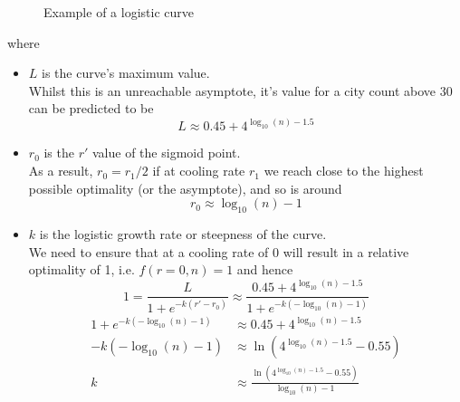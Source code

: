 \documentclass{article}
\begin{document}
\begin{figure}[H]
    \centering
    \caption{Example of a logistic curve}
\end{figure}

where
\begin{itemize}
    \item $L$ is the curve's maximum value. \\
    Whilst this is an unreachable asymptote, it's value for a city count above 30 can be predicted to be
    $$L \approx 0.45 + 4^{\log_{10}(n) - 1.5}$$
    
    \item $r_0$ is the $r'$ value of the sigmoid point. \\
    As a result, $r_0 = r_1 / 2$ if at cooling rate $r_1$ we reach close to the highest possible optimality (or the asymptote), and so is around
    $$r_0 \approx \log_{10}(n) - 1$$
    
    \item $k$ is the logistic growth rate or steepness of the curve. \\
    We need to ensure that at a cooling rate of 0 will result in a relative optimality of 1, i.e. $f(r = 0, n) = 1$ and hence
    $$1 = \frac{L}{1 + e^{-k(r' - r_0)}} \approx \frac{0.45 + 4^{\log_{10}(n) - 1.5}}{1 + e^{-k(-\log_{10}(n) - 1)}}$$
    \begin{align*}
        1 + e^{-k(-\log_{10}(n) - 1)}
            &\approx 0.45 + 4^{\log_{10}(n) - 1.5} \\
        -k(-\log_{10}(n) - 1)
            &\approx \ln(4^{\log_{10}(n) - 1.5} - 0.55) \\
        k
            &\approx \frac{\ln(4^{\log_{10}(n) - 1.5} - 0.55)}{\log_{10}(n) - 1}
    \end{align*}
\end{itemize}
\end{document}
